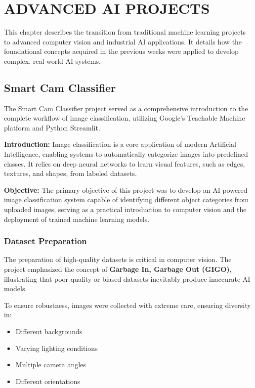 \chapter{ADVANCED AI PROJECTS}

This chapter describes the transition from traditional machine learning projects to advanced computer vision and industrial AI applications. It details how the foundational concepts acquired in the previous weeks were applied to develop complex, real-world AI systems.

\section{Smart Cam Classifier}

The Smart Cam Classifier project served as a comprehensive introduction to the complete workflow of image classification, utilizing Google's Teachable Machine platform and Python Streamlit. 

\textbf{Introduction:} Image classification is a core application of modern Artificial Intelligence, enabling systems to automatically categorize images into predefined classes. It relies on deep neural networks to learn visual features, such as edges, textures, and shapes, from labeled datasets.

\textbf{Objective:} The primary objective of this project was to develop an AI-powered image classification system capable of identifying different object categories from uploaded images, serving as a practical introduction to computer vision and the deployment of trained machine learning models.

\subsection{Dataset Preparation}

The preparation of high-quality datasets is critical in computer vision. The project emphasized the concept of \textbf{Garbage In, Garbage Out (GIGO)}, illustrating that poor-quality or biased datasets inevitably produce inaccurate AI models.

To ensure robustness, images were collected with extreme care, ensuring diversity in:
\begin{itemize}[leftmargin=1.5cm]
    \item Different backgrounds
    \item Varying lighting conditions
    \item Multiple camera angles
    \item Different orientations
\end{itemize}


